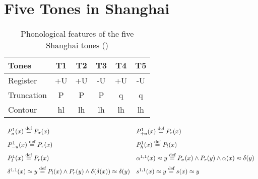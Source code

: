 \documentclass[11pt]{article}
\begin{document}




\section{Five Tones in Shanghai}

\begin{table}[h!]
	\centering
	\caption{Phonological features of the five Shanghai tones (\citep{zhu1999shanghai})} 
	\begin{tabular}{lccccc}
		\toprule
		\textbf{Tones} & \textbf{T1} & \textbf{T2} & \textbf{T3} & \textbf{T4} & \textbf{T5} \\
		\midrule
		Register   & +U & +U & -U & +U & -U \\
		Truncation & P  & P  & P  & q  & q  \\
		Contour    & hl & lh & lh & lh & lh \\
		\bottomrule
	\end{tabular}
\end{table}
\[
\begin{array}{ll}
	P^{1}_{\sigma}(x) \stackrel{\text{def}}{=} P_{\sigma}(x) 
	& P^{1}_{+u}(x) \stackrel{\text{def}}{=} P_{r}(x) \\[6pt]
	
	P^{1}_{-u}(x) \stackrel{\text{def}}{=} P_{r}(x) 
	& P^{1}_{h}(x) \stackrel{\text{def}}{=} P_{l}(x) \\[6pt]
	
	P^{1}_{l}(x) \stackrel{\text{def}}{=} P_{r}(x) 
	& \alpha^{1,1}(x) \approx y \stackrel{\text{def}}{=} P_{\sigma}(x) \wedge P_{r}(y) \wedge \alpha(x) \approx \delta(y) \\[6pt]
	
	\delta^{1,1}(x) \approx y \stackrel{\text{def}}{=} P_{l}(x) \wedge P_{r}(y) \wedge \delta(\delta(x)) \approx \delta(y)
	& s^{1,1}(x) \approx y \stackrel{\text{def}}{=} s(x) \approx y
\end{array}
\]
\end{document}
